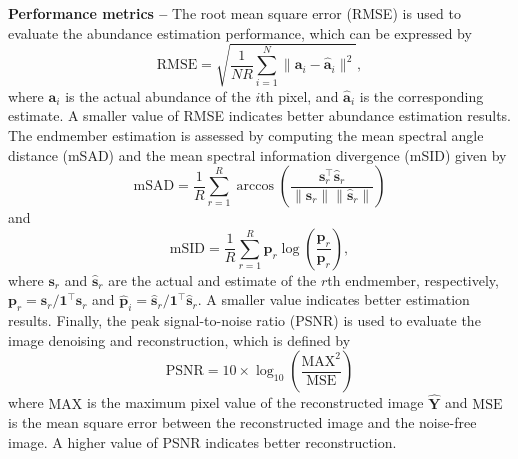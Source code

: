 \documentclass[journal,a4paper]{IEEEtran}
\newcommand{\Vend}{\mathbf{s}}
\begin{document}
\noindent \textbf{Performance metrics --} The root mean square error (RMSE) is used to evaluate the abundance estimation performance, which can be expressed by
  \begin{equation}\label{eq.rmse}
  \text{RMSE} = \sqrt{\frac{1}{NR}\sum_{i=1}^{N}\|\mathbf{a}_i-\hat{\mathbf{a}}_i\|^2},
\end{equation}
where $\mathbf{a}_i$ is the actual abundance of the $i$th pixel, and $\hat{\mathbf{a}}_i$ is the corresponding estimate. A smaller value of RMSE indicates better abundance estimation results. The endmember estimation is assessed by computing the mean spectral angle distance (mSAD) and the mean spectral information divergence (mSID) given by
  \begin{equation}\label{eq.sad}
  \text{mSAD}=\frac{1}{R}\sum_{r=1}^{R}\arccos\left(\frac{\Vend_{r}^{\top}\hat{\Vend}_r}
{\|\Vend_{r}\|\|\hat{\Vend}_r\|}\right)
\end{equation}
and
\begin{equation}\label{eq.sid}
  \text{mSID}=\frac{1}{R}\sum_{r=1}^{R}
\mathbf{p}_r\log\left(\frac{\mathbf{p}_r}{\hat{\mathbf{p}}_r}\right),
\end{equation}
where $\Vend_{r}$ and $\hat{\Vend}_r$ are the actual and estimate of the $r$th endmember, respectively, $\mathbf{p}_r={\Vend_r}/{\boldsymbol{1}^{\top}\Vend_r}$ and $\hat{\mathbf{p}}_i={\hat{\Vend}_r}/{\boldsymbol{1}^{\top}\hat{\Vend}_r}$. A smaller value indicates better estimation results. Finally, the peak signal-to-noise ratio (PSNR) is used to evaluate the image denoising and reconstruction, which is defined by
  \begin{equation}\label{eq.psnr}
  \text{PSNR}=10\times\log_{10}\left(\frac{\text{MAX}^2}{\text{MSE}}\right)
\end{equation}
where $\text{MAX}$ is the maximum pixel value of the reconstructed image $\hat{\mathbf{Y}}$ and $\text{MSE}$ is the mean square
error between the reconstructed image and the noise-free image. A higher value of PSNR indicates better reconstruction.
\end{document}
